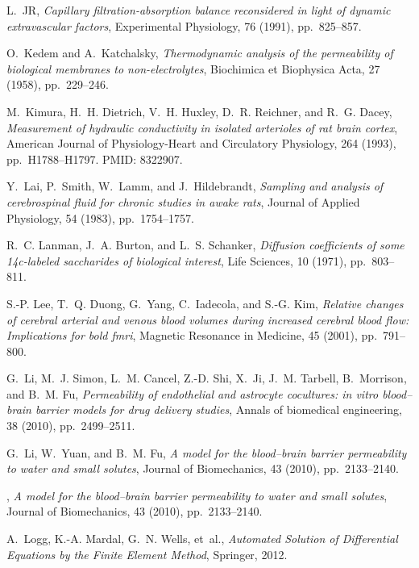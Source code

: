 \documentclass[10pt,letterpaper]{article}
\newcommand{\1}{^{(1)}}
\newcommand{\2}{^{(2)}}
\begin{document}
\begin{thebibliography}{10}
{\sc L.~JR}, {\em Capillary filtration-absorption balance reconsidered in light
  of dynamic extravascular factors}, Experimental Physiology, 76 (1991),
  pp.~825--857.

{\sc O.~Kedem and A.~Katchalsky}, {\em Thermodynamic analysis of the
  permeability of biological membranes to non-electrolytes}, Biochimica et
  Biophysica Acta, 27 (1958), pp.~229--246.

{\sc M.~Kimura, H.~H. Dietrich, V.~H. Huxley, D.~R. Reichner, and R.~G. Dacey},
  {\em Measurement of hydraulic conductivity in isolated arterioles of rat
  brain cortex}, American Journal of Physiology-Heart and Circulatory
  Physiology, 264 (1993), pp.~H1788--H1797.
\newblock PMID: 8322907.

{\sc Y.~Lai, P.~Smith, W.~Lamm, and J.~Hildebrandt}, {\em Sampling and analysis
  of cerebrospinal fluid for chronic studies in awake rats}, Journal of Applied
  Physiology, 54 (1983), pp.~1754--1757.

{\sc R.~C. Lanman, J.~A. Burton, and L.~S. Schanker}, {\em Diffusion
  coefficients of some 14c-labeled saccharides of biological interest}, Life
  Sciences, 10 (1971), pp.~803--811.

{\sc S.-P. Lee, T.~Q. Duong, G.~Yang, C.~Iadecola, and S.-G. Kim}, {\em
  Relative changes of cerebral arterial and venous blood volumes during
  increased cerebral blood flow: Implications for bold fmri}, Magnetic
  Resonance in Medicine, 45 (2001), pp.~791--800.

{\sc G.~Li, M.~J. Simon, L.~M. Cancel, Z.-D. Shi, X.~Ji, J.~M. Tarbell,
  B.~Morrison, and B.~M. Fu}, {\em Permeability of endothelial and astrocyte
  cocultures: in vitro blood--brain barrier models for drug delivery studies},
  Annals of biomedical engineering, 38 (2010), pp.~2499--2511.

{\sc G.~Li, W.~Yuan, and B.~M. Fu}, {\em A model for the blood–brain barrier
  permeability to water and small solutes}, Journal of Biomechanics, 43 (2010),
  pp.~2133--2140.

\leavevmode\vrule height 2pt depth -1.6pt width 23pt, {\em A model for the
  blood–brain barrier permeability to water and small solutes}, Journal of
  Biomechanics, 43 (2010), pp.~2133--2140.

{\sc A.~Logg, K.-A. Mardal, G.~N. Wells, et~al.}, {\em Automated Solution of
  Differential Equations by the Finite Element Method}, Springer, 2012.


\end{thebibliography}
\end{document}
